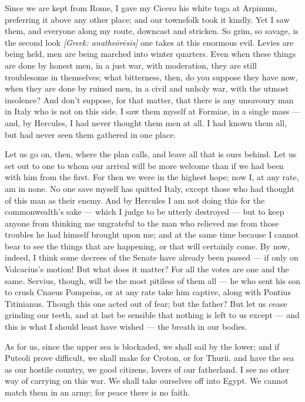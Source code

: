 

 Since we are kept from Rome, I gave my Cicero his white toga at Arpinum, preferring it above any other place; and our townsfolk took it kindly. Yet I saw them, and everyone along my route, downcast and stricken. So grim, so savage, is the second look \textit{[Greek: anathe\=or\=esis]} one takes at this enormous evil. Levies are being held, men are being marched into winter quarters. Even when these things are done by honest men, in a just war, with moderation, they are still troublesome in themselves; what bitterness, then, do you suppose they have now, when they are done by ruined men, in a civil and unholy war, with the utmost insolence? And don't suppose, for that matter, that there is any unsavoury man in Italy who is not on this side. I saw them myself at Formiae, in a single mass --- and, by Hercules, I had never thought them men at all. I had known them all, but had never seen them gathered in one place.

 Let us go on, then, where the plan calls, and leave all that is ours behind. Let us set out to one to whom our arrival will be more welcome than if we had been with him from the first. For then we were in the highest hope; now I, at any rate, am in none. No one save myself has quitted Italy, except those who had thought of this man as their enemy. And by Hercules I am not doing this for the commonwealth's sake --- which I judge to be utterly destroyed --- but to keep anyone from thinking me ungrateful to the man who relieved me from those troubles he had himself brought upon me; and at the same time because I cannot bear to see the things that are happening, or that will certainly come. By now, indeed, I think some decrees of the Senate have already been passed --- if only on Volcacius's motion! But what does it matter? For all the votes are one and the same. Servius, though, will be the most pitiless of them all --- he who sent his son to crush Cnaeus Pompeius, or at any rate take him captive, along with Pontius Titinianus. Though this one acted out of fear; but the father? But let us cease grinding our teeth, and at last be sensible that nothing is left to us except --- and this is what I should least have wished --- the breath in our bodies.

 As for us, since the upper sea is blockaded, we shall sail by the lower; and if Puteoli prove difficult, we shall make for Croton, or for Thurii, and have the sea as our hostile country, we good citizens, lovers of our fatherland. I see no other way of carrying on this war. We shall take ourselves off into Egypt. We cannot match them in an army; for peace there is no faith.

